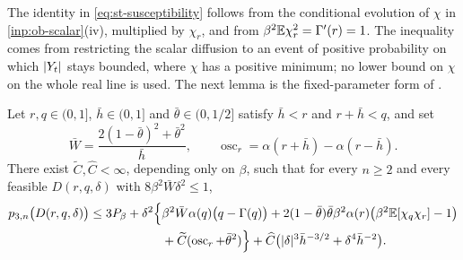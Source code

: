 The identity in \eqref{eq:st-susceptibility} follows from the conditional evolution of $\chi$ in \cref{inp:ob-scalar}(iv), multiplied by $\chi_r$, and from $\beta^2\mathbb E\chi_r^2=\Gamma'(r)=1$. The inequality comes from restricting the scalar diffusion to an event of positive probability on which $\lvert Y_t\rvert$ stays bounded, where $\chi$ has a positive minimum; no lower bound on $\chi$ on the whole real line is used. The next lemma is the fixed-parameter form of \cite[(7.29)--(7.30)]{oai-barriers}.

\begin{lemma}\label{lem:st-remote-expansion}
Let $r,q\in(0,1]$, $\bar h\in(0,1]$ and $\bar\theta\in(0,1/2]$ satisfy $\bar h<r$ and $r+\bar h<q$, and set
\[
 \bar W=\frac{2(1-\bar\theta)^2+\bar\theta^2}{\bar h},\qquad\operatorname{osc}_r=\alpha(r+\bar h)-\alpha(r-\bar h).
\]
There exist $\widetilde C,\widehat C<\infty$, depending only on $\beta$, such that for every $n\ge2$ and every feasible $D(r,q,\delta)$ with $8\beta^2\bar W\delta^2\le1$,
\begin{equation}\label{eq:st-remote-expansion}
\begin{split}
 p_{3,n}\bigl(D(r,q,\delta)\bigr)\le3P_\beta+\delta^2\Bigl\{&\beta^2\bar W\alpha(q)\bigl(q-\Gamma(q)\bigr)
 +2(1-\bar\theta)\bar\theta\beta^2\alpha(r)\bigl(\beta^2\mathbb E[\chi_q\chi_r]-1\bigr)\\
 &+\widetilde C(\operatorname{osc}_r+\bar\theta^2)\Bigr\}+\widehat C\bigl(\lvert \delta\rvert^3\bar h^{-3/2}+\delta^4\bar h^{-2}\bigr).
\end{split}
\end{equation}
\end{lemma}

